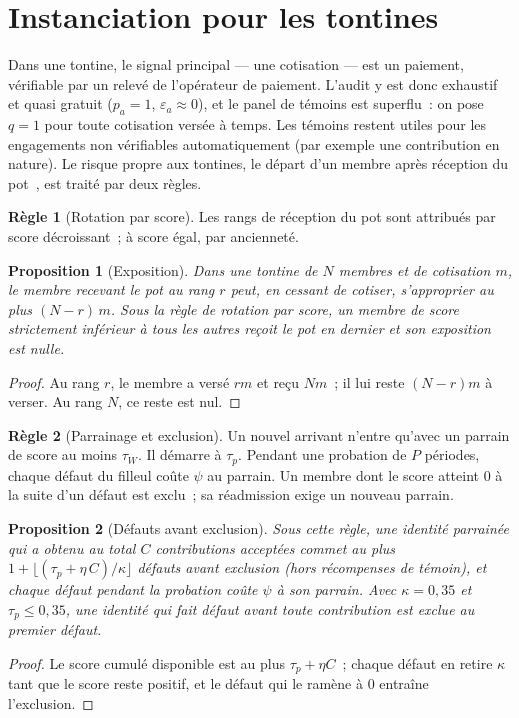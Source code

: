 \documentclass[11pt,a4paper]{article}
\theoremstyle{plain}
\newtheorem{proposition}{Proposition}
\theoremstyle{definition}
\newtheorem{regle}{Règle}
\theoremstyle{remark}
\newcommand{\1}{\mathbf{1}}
\begin{document}
\section{Instanciation pour les tontines}
\label{sec:tontine}

Dans une tontine, le signal principal --- une cotisation --- est un paiement,
vérifiable par un relevé de l'opérateur de paiement. L'audit y est donc
exhaustif et quasi gratuit ($p_a=1$, $\varepsilon_a\approx0$), et le panel de
témoins est superflu~: on pose $q=1$ pour toute cotisation versée à temps. Les
témoins restent utiles pour les engagements non vérifiables automatiquement
(par exemple une contribution en nature). Le risque propre aux tontines, le
départ d'un membre après réception du pot~\cite{anderson2009}, est traité par
deux règles.

\begin{regle}[Rotation par score]
Les rangs de réception du pot sont attribués par score décroissant~; à score
égal, par ancienneté.
\end{regle}

\begin{proposition}[Exposition]\label{prop:rotation}
Dans une tontine de $N$ membres et de cotisation $m$, le membre recevant le
pot au rang $r$ peut, en cessant de cotiser, s'approprier au plus $(N-r)\,m$.
Sous la règle de rotation par score, un membre de score strictement inférieur
à tous les autres reçoit le pot en dernier et son exposition est nulle.
\end{proposition}
\begin{proof}
Au rang $r$, le membre a versé $rm$ et reçu $Nm$~; il lui reste $(N-r)m$ à
verser. Au rang $N$, ce reste est nul.
\end{proof}

\begin{regle}[Parrainage et exclusion]
Un nouvel arrivant n'entre qu'avec un parrain de score au moins $\tau_W$. Il
démarre à $\tau_p$. Pendant une probation de $P$ périodes, chaque défaut du
filleul coûte $\psi$ au parrain. Un membre dont le score atteint 0 à la suite
d'un défaut est exclu~; sa réadmission exige un nouveau parrain.
\end{regle}

\begin{proposition}[Défauts avant exclusion]\label{prop:parrain}
Sous cette règle, une identité parrainée qui a obtenu au total $C$
contributions acceptées commet au plus $1+\lfloor(\tau_p+\eta\,C)/\kappa\rfloor$
défauts avant exclusion (hors récompenses de témoin), et chaque défaut pendant la probation coûte $\psi$ à
son parrain. Avec $\kappa=0{,}35$ et $\tau_p\le0{,}35$, une identité qui fait
défaut avant toute contribution est exclue au premier défaut.
\end{proposition}
\begin{proof}
Le score cumulé disponible est au plus $\tau_p+\eta C$~; chaque défaut en
retire $\kappa$ tant que le score reste positif, et le défaut qui le ramène à 0
entraîne l'exclusion.
\end{proof}
\end{document}
